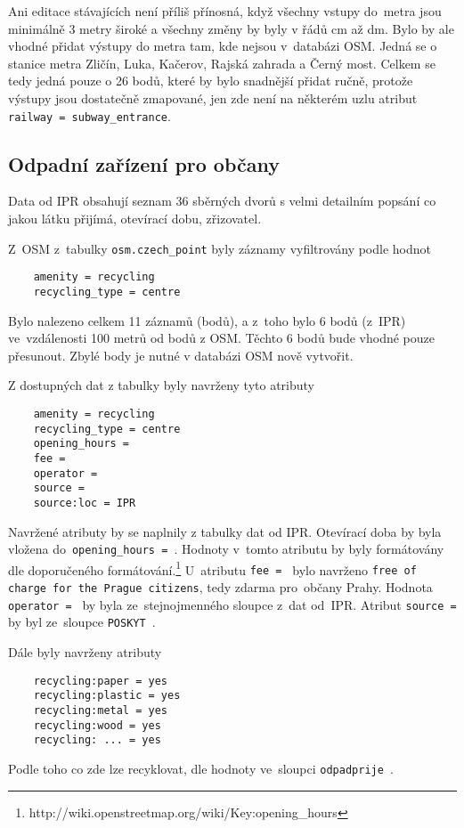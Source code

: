 Ani editace stávajících není příliš přínosná, když všechny vstupy
do~metra jsou minimálně 3 metry široké a všechny změny by byly v řádů
cm až dm. Bylo by ale vhodné přidat výstupy do metra tam, kde nejsou
v~databázi OSM. Jedná se o stanice metra Zličín, Luka, Kačerov, Rajská
zahrada a Černý most. Celkem se tedy jedná pouze o 26 bodů, které by
bylo snadnější přidat ručně, protože výstupy jsou dostatečně zmapované,
jen zde není na některém uzlu atribut {\tt railway~=~subway\_entrance}.


\subsection{Odpadní zařízení pro občany}
\label{Odpadní zařízení pro občany}
Data od IPR obsahují seznam 36 sběrných dvorů s velmi detailním
popsání co jakou látku přijímá, otevírací dobu, zřizovatel. 

Z~OSM z~tabulky {\tt osm.czech\_point} byly záznamy vyfiltrovány podle
hodnot
\begin{verbatim}
    amenity = recycling
    recycling_type = centre
\end{verbatim}    
Bylo nalezeno celkem 11 záznamů (bodů), a z~toho bylo 6 bodů (z~IPR)
ve~vzdálenosti 100 metrů od bodů z OSM. Těchto 6 bodů bude vhodné
pouze přesunout. Zbylé body je nutné v databázi OSM nově vytvořit.

Z dostupných dat z tabulky byly navrženy tyto atributy
\begin{verbatim}
    amenity = recycling
    recycling_type = centre
    opening_hours =
    fee =
    operator =
    source =
    source:loc = IPR
\end{verbatim}
Navržené atributy by se naplnily z tabulky dat od IPR. Otevírací doba
by byla vložena do~{\tt opening\_hours~= }. Hodnoty v~tomto atributu
by byly formátovány dle doporučeného formátování.\footnote{http://wiki.openstreetmap.org/wiki/Key:opening\_hours}
U~atributu {\tt fee~= } bylo navrženo {\tt free of charge for the Prague citizens}, tedy zdarma pro~občany Prahy. Hodnota
{\tt operator~= } by byla ze~stejnojmenného sloupce z~dat od~IPR. 
Atribut {\tt source~= } by byl ze~sloupce {\tt POSKYT }.

Dále byly navrženy atributy
\begin{verbatim}
    recycling:paper = yes
    recycling:plastic = yes
    recycling:metal = yes
    recycling:wood = yes
    recycling: ... = yes
\end{verbatim}
Podle toho co zde lze recyklovat, dle hodnoty ve~sloupci
{\tt odpadprije }.


